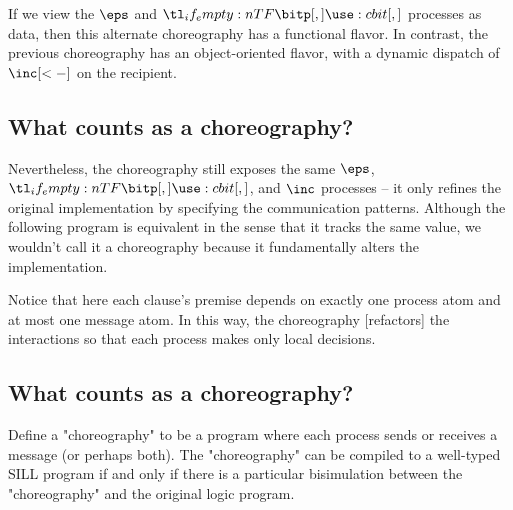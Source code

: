 If we view the $\eps$ and $\bit{}$ processes as data, then this alternate choreography has a functional flavor.
In contrast, the previous choreography has an object-oriented flavor, with a dynamic dispatch of $\inc[<-]$ on the recipient.

\subsection{What counts as a choreography?}\label{sec:what-counts-choreo}

Nevertheless, the choreography still exposes the same $\eps$, $\bit{}$, and $\inc$ processes -- it only refines the original implementation by specifying the communication patterns.
Although the following program is equivalent in the sense that it tracks the same value, we wouldn't call it a choreography because it fundamentally alters the implementation.



Notice that here each clause's premise depends on exactly one process atom and at most one message atom.
In this way, the choreography [refactors] the interactions so that each process makes only local decisions.














\subsection{What counts as a choreography?}\label{sec:what-counts-choreo}

\begin{claim*}
  Define a "choreography" to be a program where each process sends or receives a message (or perhaps both).
  The "choreography" can be compiled to a well-typed SILL program if and only if there is a particular bisimulation between the "choreography" and the original logic program.
\end{claim*}


